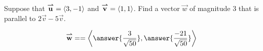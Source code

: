 \documentclass{ximera}
\author{Jim Talamo}
\begin{document}
\begin{exercise}
Suppose that ${\overset{\boldsymbol{\rightharpoonup}}{\mathbf{u}}} = \left\langle 3,-1\right\rangle$ and ${\overset{\boldsymbol{\rightharpoonup}}{\mathbf{v}}} = \left\langle 1,1\right\rangle$.  Find a vector $\vec{w}$ of magnitude $3$ that is parallel to $2\vec{v}-5\vec{v}$.

\[
\vec{w} == \vector{\answer{\frac{3}{\sqrt{50}} }, \answer{ \frac{-21}{\sqrt{50}} }}
\]

\end{exercise}
\end{document}
